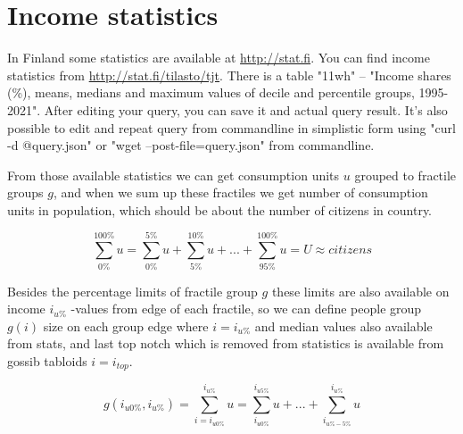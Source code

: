 %
%
%
\chapter{Income statistics}
\label{statistics}
In Finland some statistics are available at \url{http://stat.fi}.
You can find income statistics from \url{http://stat.fi/tilasto/tjt}.
There is a table "11wh" -- "Income shares (\%), means, medians and maximum
values of decile and percentile groups, 1995-2021". After editing your query,
you can save it and actual query result. It's also possible to edit and repeat
query from commandline in simplistic form using "curl -d @query.json"
or "wget --post-file=query.json" from commandline.

From those available statistics we can get consumption units $u$ grou\-ped to
fractile groups $g$, and when we sum up these fractiles we get number of
consumption units\allowbreak\cite{ConsumptionUnitD} in population, which
should be about the number of citizens in country.

\begin{equation} \label{eq:fractile_units_sum}
	\sum_{0\%}^{100\%} u =
	\sum_{0\%}^{5\%} u +
	\sum_{5\%}^{10\%} u +
	...+
	\sum_{95\%}^{100\%} u = U \approx citizens
\end{equation}

Besides the percentage limits of fractile group $g$ these limits are also
available on income $i_{u\%}$ -values from edge of each fractile, so we can
define people group $g(i)$ size on each group edge where $i=i_{u\%}$ and
median values also available from stats, and last top notch which is removed
from statistics is available from gossib tabloids $i=i_{top}$.

\begin{equation} \label{eq:fractile_units_group}
	g(i_{u0\%},i_{u\%})=
        \sum_{i=i_{u0\%}}^{i_{u\%}} u =
	\sum_{i_{u0\%}}^{i_{u5\%}} u+
	...+
	\sum_{i_{u\%-5\%}}^{i_{u\%}} u
\end{equation}

